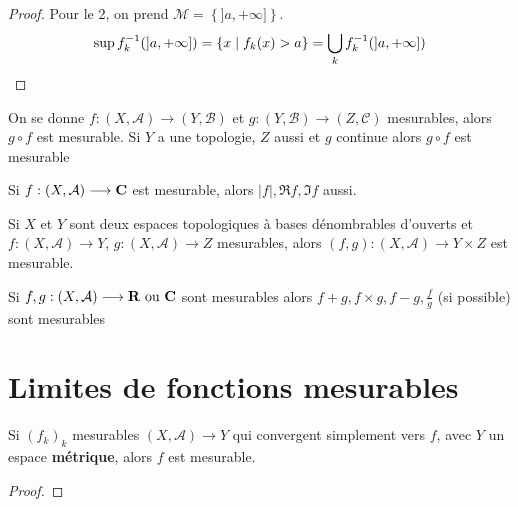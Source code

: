 \begin{proof}
    Pour le 2, on prend $\mathcal  M = \left\{ ]a, +\infty] \right\} $. \[
        \sup f_k^{-1}(]a, +\infty])= \left\{  x \suchthat f_k(x)>a \right\} = \bigcup_k f_k^{-1}(]a, +\infty])
    \] 
\end{proof}

\begin{prop}
    On se donne $f:(X, \mathcal  A) \longrightarrow (Y, \mathcal B)$ et $g:(Y, \mathcal  B)\longrightarrow (Z, \mathcal  C)$ mesurables, alors $g\circ f$ est mesurable.
    Si  $Y$ a une topologie, $Z$ aussi et $g$ continue alors  $g\circ f $ est mesurable
\end{prop}

\begin{cor}
    Si $f:(X, \mathcal  A)\longrightarrow \mathbf C$ est mesurable, alors $|f|, \Re f, \Im f$ aussi.
\end{cor}

\begin{prop}
    Si $X$ et  $Y$ sont deux espaces topologiques à bases dénombrables d'ouverts et  $f:(X, \mathcal  A)\longrightarrow Y$, $g:(X, \mathcal  A)\longrightarrow Z$ mesurables, alors $(f, g):(X, \mathcal  A)\longrightarrow Y\times Z$ est mesurable.
\end{prop}

\begin{cor}
    Si $f,g:(X, \mathcal  A)\longrightarrow \mathbf R\text{ ou }\mathbf C$ sont mesurables alors $f+g, f\times g, f-g, \frac{f}{g}$ (si possible) sont mesurables
\end{cor}

\section{Limites de fonctions mesurables}

\begin{thm}
    Si $(f_k)_k$ mesurables $(X, \mathcal A)\longrightarrow Y$ qui convergent simplement vers $f$, avec $Y$ un espace \textbf{métrique}, alors  $f$ est mesurable.
\end{thm}

\begin{proof}
\end{proof}
